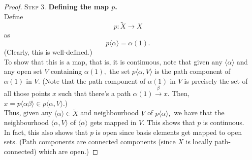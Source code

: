 \documentclass[12pt]{article}
\theoremstyle{definition}
\numberwithin{thm}{section}
\begin{document}
\begin{proof}
\textsc{Step 3.} \textbf{Defining the map $p$.}\\
Define
\begin{equation*} 
	p:\tilde{X} \to X
\end{equation*}
as
\begin{equation*} 
	p\langle \alpha\rangle = \alpha(1).
\end{equation*}
(Clearly, this is well-defined.)\\
To show that this is a map, that is, it is continuous, note that given any $\langle \alpha\rangle$ and any open set $V$ containing $\alpha(1),$ the set $p\langle \alpha, V\rangle$ is the path component of $\alpha(1)$ in $V.$ (Note that the path component of $\alpha(1)$ in $V$ is precisely the set of all those points $x$ such that there's a path $\alpha(1) \overset{\beta}{\longrightarrow}x.$ Then, $x = p\langle \alpha\beta\rangle \in p\langle \alpha, V\rangle.$)\\
Thus, given any $\langle \alpha\rangle \in \tilde{X}$ and neighbourhood $V$ of $p\langle \alpha\rangle,$ we have that the neighbourhood $\langle \alpha, V\rangle$ of $\langle \alpha\rangle$ gets mapped in $V.$ This shows that $p$ is continuous. In fact, this also shows that $p$ is open since basis elements get mapped to open sets. (Path components are connected components (since $X$ is locally path-connected) which are open.)

\dotfill


\end{proof}
\end{document}
